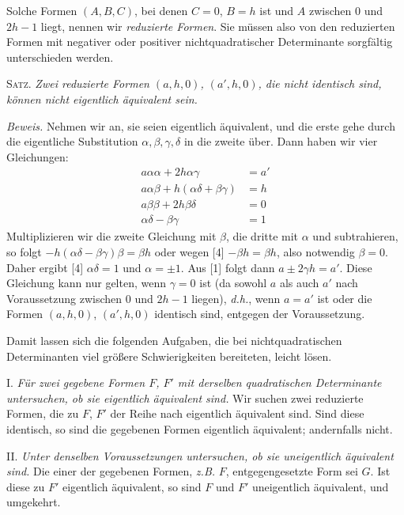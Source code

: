 Solche Formen $(A,B,C)$, bei denen $C=0$, $B=h$ ist und $A$ zwischen $0$ und $2h-1$ liegt, nennen wir \textit{reduzierte Formen}. Sie müssen also von den reduzierten Formen mit negativer oder positiver nichtquadratischer Determinante sorgfältig unterschieden werden.

\textsc{Satz.} \textit{Zwei reduzierte Formen $(a,h,0)$, $(a',h,0)$, die nicht identisch sind, können nicht eigentlich äquivalent sein.}

\textit{Beweis.} Nehmen wir an, sie seien eigentlich äquivalent, und die erste gehe durch die eigentliche Substitution $\alpha,\beta,\gamma,\delta$ in die zweite über. Dann haben wir vier Gleichungen:
\begin{align*}
a\alpha\alpha+2h\alpha\gamma&=a'\tag*{. . . . . . . . . [1]}\\
a\alpha\beta+h(\alpha\delta+\beta\gamma)&=h\tag*{. . . . . . . [2]}\\
a\beta\beta+2h\beta\delta&=0\tag*{. . . . . . . . . . [3]}\\
\alpha\delta-\beta\gamma&=1\tag*{. . . . . . . . . . . [4]}
\end{align*}
Multiplizieren wir die zweite Gleichung mit $\beta$, die dritte mit $\alpha$ und subtrahieren, so folgt $-h(\alpha\delta-\beta\gamma)\beta=\beta h$ oder wegen [4] $-\beta h=\beta h$, also notwendig $\beta=0$. Daher ergibt [4] $\alpha\delta=1$ und $\alpha=\pm1$. Aus [1] folgt dann $a\pm2\gamma h=a'$. Diese Gleichung kann nur gelten, wenn $\gamma=0$ ist (da sowohl $a$ als auch $a'$ nach Voraussetzung zwischen $0$ und $2h-1$ liegen), \textit{d.h.}, wenn $a=a'$ ist oder die Formen $(a,h,0)$, $(a',h,0)$ identisch sind, entgegen der Voraussetzung.

Damit lassen sich die folgenden Aufgaben, die bei nichtquadratischen Determinanten viel größere Schwierigkeiten bereiteten, leicht lösen.

I. \textit{Für zwei gegebene Formen $F$, $F'$ mit derselben quadratischen Determinante untersuchen, ob sie eigentlich äquivalent sind.} Wir suchen zwei reduzierte Formen, die zu $F$, $F'$ der Reihe nach eigentlich äquivalent sind. Sind diese identisch, so sind die gegebenen Formen eigentlich äquivalent; andernfalls nicht.

II. \textit{Unter denselben Voraussetzungen untersuchen, ob sie uneigentlich äquivalent sind.} Die einer der gegebenen Formen, \textit{z.B.} $F$, entgegengesetzte Form sei $G$. Ist diese zu $F'$ eigentlich äquivalent, so sind $F$ und $F'$ uneigentlich äquivalent, und umgekehrt.
